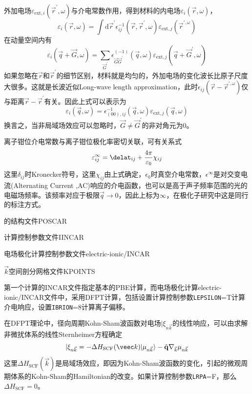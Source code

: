 外加电场$\varepsilon_{\mathrm{ext},i}(\vec r^{\prime},\omega)$与介电常数作用，得到材料的内电场$\varepsilon_i(\vec r ,\omega)$，
\begin{displaymath}
	\varepsilon_i(\vec r,\omega)=\int\mathrm{d}\vec r^{\prime}\epsilon_{ij}^{-1}(\vec r,\vec r^{\prime},\omega)\varepsilon_{\mathrm{ext},j}(\vec r^{\prime,\omega})
\end{displaymath}
在动量空间内有
\begin{displaymath}
	\varepsilon_i(\vec q+\vec G,\omega)=\sum_{\vec G^{\prime}}\epsilon_{\vec G\vec G^{\prime}}^{(-1)}(\vec q,\omega)\varepsilon_{\mathrm{ext},j}(\vec q+\vec G^{\prime},\omega)
\end{displaymath}
如果忽略在$\vec r$和$\vec r^{\prime}$的细节区别，材料就是均匀的，外加电场的变化波长比原子尺度大很多。这就是长波近似\textrm{Long-wave length approximation}，此时$\epsilon_{ij}(\vec r-\vec r^{\prime,\omega})$仅与距离$\vec r-\vec r^{\prime}$有关。因此上式可以表示为
\begin{displaymath}
	\varepsilon_i(\vec q,\omega)=\epsilon_{(00),ij}^{-1}(\vec q,\omega)\varepsilon_{\mathrm{ext},j}(\vec q,\omega)
\end{displaymath}
换言之，当非局域场效应可以忽略时，$\vec G\neq\vec G^{\prime}$的非对角元为0。

离子钳位介电常数与离子钳位极化率密切关联，可有关系式
\begin{displaymath}
	\varepsilon_{ij}^{\infty}=\delat_{ij}+\dfrac{4\pi}{\varepsilon_0}\chi_{ij}
\end{displaymath}
这里$\delta_{ij}$时\textrm{Kronecker}符号，这里$\chi_{ij}$由上式确定，$\epsilon_0$时真空介电常数，$\epsilon^{\infty}$是对交变电流\textrm{(Alternating Current ,AC)}响应的介电函数，也可以是高于声子频率范围的光的电磁场频率。该频率对应于极限$\vec q\rightarrow0$，因此上标为$\infty$，在极化子研究中这是同行的标注方式。

的结构文件\textrm{POSCAR}

计算控制参数文件\textrm{IINCAR}

电场极化计算控制参数文件\textrm{electric-ionic/INCAR}

$\vec k$空间剖分网格文件\textrm{KPOINTS}

第一个计算的\textrm{INCAR}文件指定基本的\textrm{PBE}计算，而电场极化计算\textrm{electric-ionic/INCAR}文件中，采用\textrm{DFPT}计算，包括设置计算控制参数\texttt{LEPSILON}=\textrm{T}计算介电响应，设置\texttt{IBRION}=8计算离子偏移。

在\textrm{DFPT}理论中，径向周期\textrm{Kohn-Sham}波函数对电场$|\xi_{n\vec k}$的线性响应，可以由求解非微扰体系的线性\textrm{Sternheimer}方程确定
\begin{displaymath}
	[H(\vec k)-\epsilon_{n\vec k}S(\vec k)]|\xi_{n\vec k}=-\Delta H_{\mathrm{SCF}}(\veec k)|\mu_{n\vec k}\rangle-\hat{\mathbf q}\nabla_{\vec k}\mu_{n\vec k}
\end{displaymath}
这里$\Delta H_{\mathrm{SCF}}(\vec k)$是局域场效应，即因为\textrm{Kohn-Sham}波函数的变化，引起的微观周期体系的\textrm{Kohn-Sham}的\textrm{Hamiltonian}的改变。如果计算控制参数\texttt{LRPA}=\textrm{F}，那么$\Delta H_{\mathrm{SCF}}=0$。

